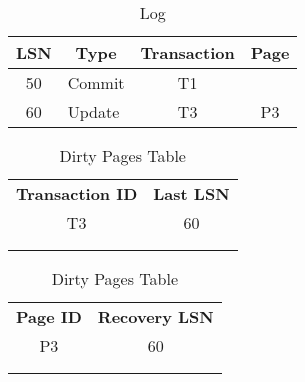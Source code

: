 \begin{table}[H]
\centering
\begin{tabular}{|c|l|c|c|}
\hline
\textbf{LSN}           & \multicolumn{1}{c|}{\textbf{Type}} & \textbf{Transaction}  & \textbf{Page}         \\ \hline
50                     & Commit                             & T1                    &                       \\ \hline
60                     & Update                             & T3                    & P3                    \\ \hline
\end{tabular}
\caption{Log}
\end{table}

\begin{table}[H]
    \begin{minipage}{.5\linewidth}
      \centering
		\begin{tabular}{|c|c|}
		\cline{1-2}
		\textbf{Transaction ID} & \textbf{Last LSN} \\ \cline{1-2}
		T3             & 60       \\ \cline{1-2}
		               &          \\ \cline{1-2}
		               &          \\ \cline{1-2}
		\end{tabular}
      \caption{Active Transactions Table}

    \end{minipage}%
    \begin{minipage}{.5\linewidth}
      \centering
		\begin{tabular}{|c|c|}
		\cline{1-2}
		\textbf{Page ID} & \textbf{Recovery LSN} \\ \cline{1-2}
		P3      & 60           \\ \cline{1-2}
		        &              \\ \cline{1-2}
		        &              \\ \cline{1-2}
		\end{tabular}
        \caption{Dirty Pages Table}

    \end{minipage} 
\end{table}